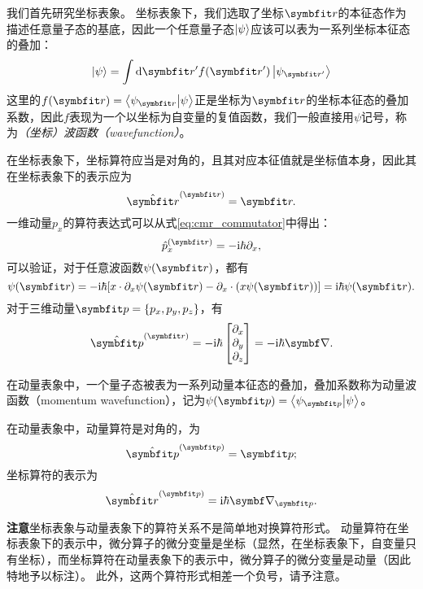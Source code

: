 我们首先研究坐标表象。
坐标表象下，我们选取了坐标$\rr$的本征态作为描述任意量子态的基底，因此一个任意量子态$\ket{\psi}$应该可以表为一系列坐标本征态的叠加：
\begin{equation}
    \ket{\psi} = \int \dd\rr' f(\rr') \ket{\psi_{\rr'}}
\end{equation}
这里的$f(\rr)=\braket{\psi_{\rr}}{\psi}$正是坐标为$\rr$的坐标本征态的叠加系数，因此$f$表现为一个以坐标为自变量的复值函数，我们一般直接用$\psi$记号，称为\emph{（坐标）波函数（wavefunction）}。

\begin{tcolorbox}
在坐标表象下，坐标算符应当是对角的，且其对应本征值就是坐标值本身，因此其在坐标表象下的表示应为
\begin{equation}
    \hat{\rr}^{(\rr)} = \rr.
\end{equation}
一维动量$p_x$的算符表达式可以从式\eqref{eq:cmr_commutator}中得出：
\begin{equation}
    \hat{p}_x^{(\rr)} = -\ii\hbar\pd_x,
\end{equation}
可以验证，对于任意波函数$\psi(\rr)$，都有
\begin{equation}
    [x,\hat{p}_x] \psi(\rr) = -\ii\hbar [x\cdot\pd_x\psi(\rr) - \pd_x\cdot (x\psi(\rr))] = \ii\hbar \psi(\rr).
\end{equation}
对于三维动量$\pp=\{p_x,p_y,p_z\}$，有
\begin{equation}
    \hat{\pp}^{(\rr)} = -\ii\hbar
    \begin{bmatrix}
        \pd_x \\ \pd_y \\ \pd_z
    \end{bmatrix}
    = -\ii\hbar\del.
\end{equation}
\end{tcolorbox}

在动量表象中，一个量子态被表为一系列动量本征态的叠加，叠加系数称为动量波函数（momentum wavefunction），记为$\psi(\pp)=\braket{\psi_{\pp}}{\psi}$。
\begin{tcolorbox}
    在动量表象中，动量算符是对角的，为
    \begin{equation}
        \hat{\pp}^{(\pp)} = \pp;
    \end{equation}
    坐标算符的表示为
    \begin{equation}
        \hat{\rr}^{(\pp)} = \ii\hbar\del_{\pp}.
    \end{equation}

    \textbf{注意}\quad 坐标表象与动量表象下的算符关系不是简单地对换算符形式。
    动量算符在坐标表象下的表示中，微分算子的微分变量是坐标（显然，在坐标表象下，自变量只有坐标），而坐标算符在动量表象下的表示中，微分算子的微分变量是动量（因此特地予以标注）。
    此外，这两个算符形式相差一个负号，请予注意。
\end{tcolorbox}

